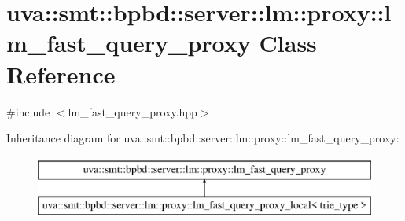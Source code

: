 \hypertarget{classuva_1_1smt_1_1bpbd_1_1server_1_1lm_1_1proxy_1_1lm__fast__query__proxy}{}\section{uva\+:\+:smt\+:\+:bpbd\+:\+:server\+:\+:lm\+:\+:proxy\+:\+:lm\+\_\+fast\+\_\+query\+\_\+proxy Class Reference}
\label{classuva_1_1smt_1_1bpbd_1_1server_1_1lm_1_1proxy_1_1lm__fast__query__proxy}


{\ttfamily \#include $<$lm\+\_\+fast\+\_\+query\+\_\+proxy.\+hpp$>$}

Inheritance diagram for uva\+:\+:smt\+:\+:bpbd\+:\+:server\+:\+:lm\+:\+:proxy\+:\+:lm\+\_\+fast\+\_\+query\+\_\+proxy\+:\begin{figure}[H]
\begin{center}
\leavevmode
\includegraphics[height=2.000000cm]{classuva_1_1smt_1_1bpbd_1_1server_1_1lm_1_1proxy_1_1lm__fast__query__proxy}
\end{center}
\end{figure}
